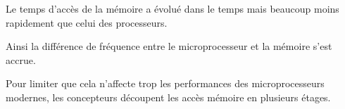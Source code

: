 \begin{enumerate}
    \begin{correction}

      Le temps d'acc\`es de la m\'emoire a \'evolu\'e dans le temps mais
      beaucoup moins rapidement que celui des processeurs.

      Ainsi la diff\'erence de fr\'equence entre le microprocesseur et
      la m\'emoire s'est accrue.

      Pour limiter que cela n'affecte trop les performances des
      microprocesseurs modernes, les concepteurs d\'ecoupent les acc\`es
      m\'emoire en plusieurs \'etages.

    \end{correction}

\end{enumerate}



